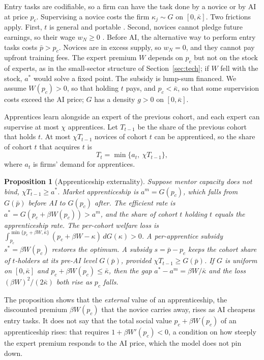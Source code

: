 \documentclass[12pt]{article}
\newtheorem{proposition}{Proposition}
\theoremstyle{remark}
\begin{document}
Entry tasks are codifiable, so a firm can have the task done by a novice or by AI at price $p_c$. Supervising a novice costs the firm $\kappa_j\sim G$ on $[0,\bar\kappa]$. Two frictions apply. First, $t$ is general and portable \citep{becker1962investment}. Second, novices cannot pledge future earnings, so their wage $w_N\ge0$ \citep{ide2025automation}. Before AI, the alternative way to perform entry tasks costs $\bar p>p_c$. Novices are in excess supply, so $w_N=0$, and they cannot pay upfront training fees. The expert premium $W$ depends on $p_c$ but not on the stock of experts, as in the small-sector structure of Section~\ref{sec:tech}; if $W$ fell with the stock, $a^*$ would solve a fixed point. The subsidy is lump-sum financed. We assume $W(p_c)>0$, so that holding $t$ pays, and $p_c<\bar\kappa$, so that some supervision costs exceed the AI price; $G$ has a density $g>0$ on $[0,\bar\kappa]$.

Apprentices learn alongside an expert of the previous cohort, and each expert can supervise at most $\chi$ apprentices. Let $T_{t-1}$ be the share of the previous cohort that holds $t$. At most $\chi T_{t-1}$ novices of cohort $t$ can be apprenticed, so the share of cohort $t$ that acquires $t$ is
\begin{equation}\label{eq:capacity}
T_t=\min\{a_t,\ \chi T_{t-1}\},
\end{equation}
where $a_t$ is firms' demand for apprentices.

\begin{proposition}[Apprenticeship externality]\label{prop:apprentice}
Suppose mentor capacity does not bind, $\chi T_{t-1}\ge a^*$. Market apprenticeship is $a^m=G(p_c)$, which falls from $G(\bar p)$ before AI to $G(p_c)$ after. The efficient rate is $a^*=G(p_c+\beta W(p_c))>a^m$, and the share of cohort $t$ holding $t$ equals the apprenticeship rate. The per-cohort welfare loss is $\int_{p_c}^{\min\{p_c+\beta W,\bar\kappa\}}(p_c+\beta W-\kappa)\,dG(\kappa)>0$. A per-apprentice subsidy $s^*=\beta W(p_c)$ restores the optimum. A subsidy $s=\bar p-p_c$ keeps the cohort share of $t$-holders at its pre-AI level $G(\bar p)$, provided $\chi T_{t-1}\ge G(\bar p)$. If $G$ is uniform on $[0,\bar\kappa]$ and $p_c+\beta W(p_c)\le\bar\kappa$, then the gap $a^*-a^m=\beta W/\bar\kappa$ and the loss $(\beta W)^2/(2\bar\kappa)$ both rise as $p_c$ falls.
\end{proposition}

The proposition shows that the \emph{external} value of an apprenticeship, the discounted premium $\beta W(p_c)$ that the novice carries away, rises as AI cheapens entry tasks. It does not say that the total social value $p_c+\beta W(p_c)$ of an apprenticeship rises: that requires $1+\beta W'(p_c)<0$, a condition on how steeply the expert premium responds to the AI price, which the model does not pin down.
\end{document}
